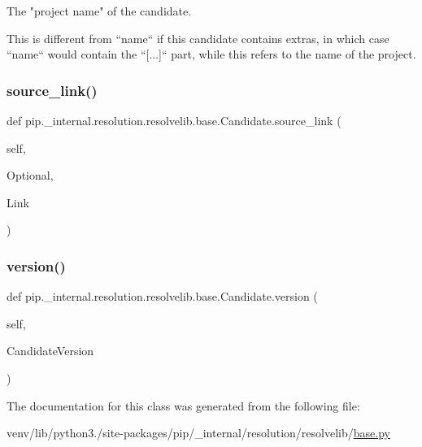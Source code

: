 \begin{DoxyVerb}The "project name" of the candidate.

This is different from ``name`` if this candidate contains extras,
in which case ``name`` would contain the ``[...]`` part, while this
refers to the name of the project.
\end{DoxyVerb}
 \mbox{\label{classpip_1_1__internal_1_1resolution_1_1resolvelib_1_1base_1_1Candidate_a68d96afd0647cf63da55953c2ac2e489}} 
\subsubsection{\texorpdfstring{source\+\_\+link()}{source\_link()}}
{\footnotesize\ttfamily def pip.\+\_\+internal.\+resolution.\+resolvelib.\+base.\+Candidate.\+source\+\_\+link (\begin{DoxyParamCaption}\item[{}]{self,  }\item[{}]{Optional,  }\item[{}]{Link }\end{DoxyParamCaption})}

\mbox{\label{classpip_1_1__internal_1_1resolution_1_1resolvelib_1_1base_1_1Candidate_a3438563e0acd16869e50ac3b3f0e754c}} 
\subsubsection{\texorpdfstring{version()}{version()}}
{\footnotesize\ttfamily def pip.\+\_\+internal.\+resolution.\+resolvelib.\+base.\+Candidate.\+version (\begin{DoxyParamCaption}\item[{}]{self,  }\item[{}]{Candidate\+Version }\end{DoxyParamCaption})}



The documentation for this class was generated from the following file\+:\begin{DoxyCompactItemize}
\item 
venv/lib/python3./site-\/packages/pip/\+\_\+internal/resolution/resolvelib/\hyperlink{__internal_2resolution_2resolvelib_2base_8py}{base.\+py}\end{DoxyCompactItemize}

